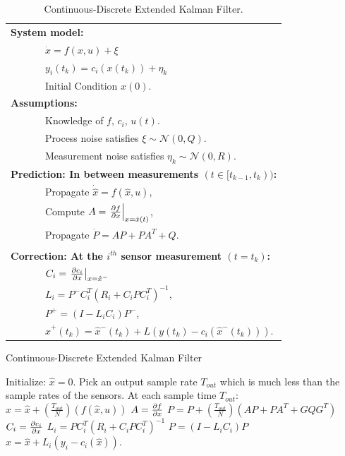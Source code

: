 {\begin{table}[hhhhtb]
\begin{center}
\begin{tabular}{l}
\hline
\textbf{System model:} \\
~~~~~~~$\dot{x}=f(x,u) + \xi$ \\
~~~~~~~$y_i(t_k)=c_i(x(t_k)) + \eta_k$ \\
~~~~~~~Initial Condition $x(0)$. \\
\textbf{Assumptions:} \\
~~~~~~~Knowledge of $f$, $c_i$, $u(t)$. \\
~~~~~~~Process noise satisfies $\xi\sim\mathcal{N}(0,Q)$. \\
~~~~~~~Measurement noise satisfies $\eta_k\sim\mathcal{N}(0,R)$. \\
\textbf{Prediction: In between measurements $(t\in[t_{k-1}, t_k))$:} \\
~~~~~~~Propagate $\dot{\hat{x}}=f(\hat{x}, u)$, \\
~~~~~~~Compute $A = \left.\frac{\partial f}{\partial x}\right|_{x=\hat{x}(t)}$, \\
~~~~~~~Propagate $\dot{P}=AP + PA^T + Q$. \\
\\
\textbf{Correction: At the $i^{th}$ sensor measurement $(t=t_k)$:} \\
~~~~~~~$C_i = \left.\frac{\partial c_i}{\partial x}\right|_{x=\hat{x}^{-}}$ \\
~~~~~~~$L_i = P^{-}C_i^T(R_i + C_iPC_i^T)^{-1},$ \\
~~~~~~~$P^{+} = (I-L_iC_i)P^{-}$, \\
~~~~~~~$\hat{x}^+(t_k) = \hat{x}^-(t_k) + L\left( y(t_k) - c_i(\hat{x}^-(t_k)) \right).$ \\
\hline
\end{tabular}
\end{center}
\label{table:ekf} \caption{Continuous-Discrete Extended Kalman
Filter.}
\end{table}

\begin{algorithm}
\caption{Continuous-Discrete Extended Kalman Filter} \label{alg:ekf}
\begin{algorithmic}[1]
    \STATE Initialize:  $\hat{x} = 0$.
    \STATE Pick an output sample rate $T_{out}$ which is much less than
    the sample rates of the sensors.
    \STATE At each sample time $T_{out}$:
        \STATE $\hat{x} = \hat{x} + \left(\frac{T_{out}}{N}\right) \left(
        f(\hat{x}, u)\right)$
        \STATE $A = \frac{\partial f}{\partial x}$
        \STATE $P = P + \left(\frac{T_{out}}{N}\right)
        \left(AP+PA^T + GQG^T\right)$
    \ENDFOR
        \STATE $C_i = \frac{\partial c_i}{\partial x}$
        \STATE $L_i = PC_i^T(R_i+C_iPC_i^T)^{-1}$
        \STATE $P = (I-L_iC_i)P$
        \STATE $\hat{x} = \hat{x} +  L_i\left( y_i - c_i( \hat{x})
        \right)$.
    \ENDIF
\end{algorithmic}
\end{algorithm}

}
